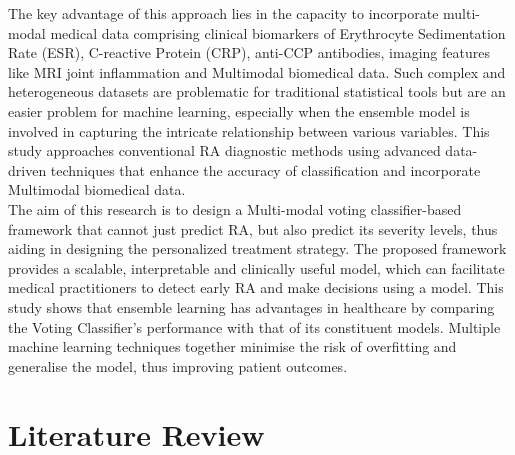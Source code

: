 \documentclass[10pt]{NSP1}
\begin{document}
	The key advantage of this approach lies in the capacity to incorporate multi-modal medical data comprising clinical biomarkers of Erythrocyte Sedimentation Rate (ESR), C-reactive Protein (CRP), anti-CCP antibodies, imaging features like MRI joint inflammation and Multimodal biomedical data. Such complex and heterogeneous datasets are problematic for traditional statistical tools but are an easier problem for machine learning, especially when the ensemble model is involved in capturing the intricate relationship between various variables. This study approaches conventional RA diagnostic methods using advanced data-driven techniques that enhance the accuracy of classification and incorporate Multimodal biomedical data.\\
	The aim of this research is to design a Multi-modal voting classifier-based framework that cannot just predict RA, but also predict its severity levels, thus aiding in designing the personalized treatment strategy. The proposed framework provides a scalable, interpretable and clinically useful model, which can facilitate medical practitioners to detect early RA and make decisions using a model. This study shows that ensemble learning has advantages in healthcare by comparing the Voting Classifier's performance with that of its constituent models. Multiple machine learning techniques together minimise the risk of overfitting and generalise the model, thus improving patient outcomes.
	
	\section{Literature Review}
	
\end{document}
